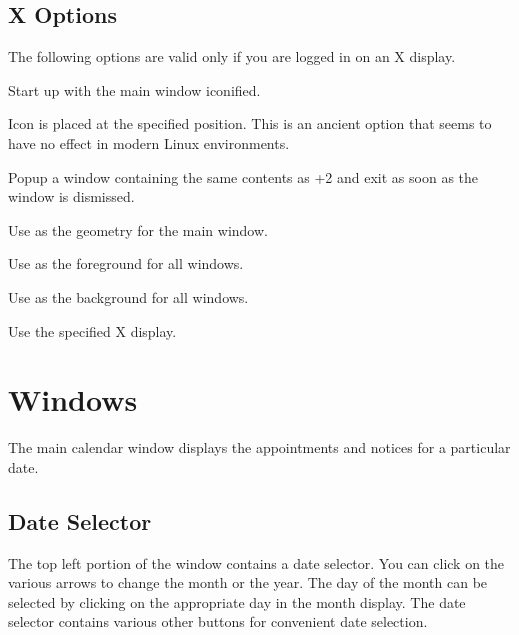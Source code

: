 \documentclass[a4paper,english]{article}
\begin{document}
\subsection{X Options}
\begin{Description}\setlength{\itemsep}{0cm}

The following options are valid only if you are logged in on an X display.

\item[\oOptArg{-iconic}{}]
    Start up with the main window iconified.

\item[\oOptArg{-iconposition}{ x,y}]
    Icon is placed at the specified position. This is an ancient
    option that seems to have no effect in modern Linux environments.

\item[\oOptArg{-popup}{}]
    Popup a window containing the same contents as  +2
    and exit as soon as the window is dismissed.

\item[\oOptArg{-geometry}{ +x+y}]
    Use  as the geometry for the main window.

\item[\oOptArg{-fg}{ color}]
    Use  as the foreground for all windows.

\item[\oOptArg{-bg}{ color}]
    Use  as the background for all windows.

\item[\oOptArg{-display}{ display}]
    Use the specified X display.

\end{Description}

\section{Windows}
    The main calendar window displays the appointments and notices for
    a particular date.

    \subsection{Date Selector}
        The top left portion of the window contains a date selector.
        You can click on the various arrows to change the month or the
        year.  The day of the month can be selected by clicking on the
        appropriate day in the month display.  The date selector
        contains various other buttons for convenient date selection.
\end{document}
